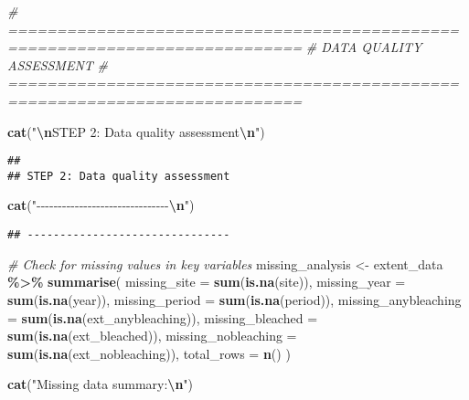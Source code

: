 \documentclass[
]{article}
\newenvironment{Shaded}{\begin{snugshade}}{\end{snugshade}}
\newcommand{\AttributeTok}[1]{\textcolor[rgb]{0.13,0.29,0.53}{#1}}
\newcommand{\CommentTok}[1]{\textcolor[rgb]{0.56,0.35,0.01}{\textit{#1}}}
\newcommand{\FunctionTok}[1]{\textcolor[rgb]{0.13,0.29,0.53}{\textbf{#1}}}
\newcommand{\NormalTok}[1]{#1}
\newcommand{\OtherTok}[1]{\textcolor[rgb]{0.56,0.35,0.01}{#1}}
\newcommand{\SpecialCharTok}[1]{\textcolor[rgb]{0.81,0.36,0.00}{\textbf{#1}}}
\newcommand{\StringTok}[1]{\textcolor[rgb]{0.31,0.60,0.02}{#1}}
\begin{document}
\begin{Shaded}
\begin{Highlighting}[]
\CommentTok{\# ============================================================================}
\CommentTok{\# DATA QUALITY ASSESSMENT}
\CommentTok{\# ============================================================================}

\FunctionTok{cat}\NormalTok{(}\StringTok{"}\SpecialCharTok{\textbackslash{}n}\StringTok{STEP 2: Data quality assessment}\SpecialCharTok{\textbackslash{}n}\StringTok{"}\NormalTok{)}
\end{Highlighting}
\end{Shaded}

\begin{verbatim}
## 
## STEP 2: Data quality assessment
\end{verbatim}

\begin{Shaded}
\begin{Highlighting}[]
\FunctionTok{cat}\NormalTok{(}\StringTok{"{-}{-}{-}{-}{-}{-}{-}{-}{-}{-}{-}{-}{-}{-}{-}{-}{-}{-}{-}{-}{-}{-}{-}{-}{-}{-}{-}{-}{-}{-}{-}}\SpecialCharTok{\textbackslash{}n}\StringTok{"}\NormalTok{)}
\end{Highlighting}
\end{Shaded}

\begin{verbatim}
## -------------------------------
\end{verbatim}

\begin{Shaded}
\begin{Highlighting}[]
\CommentTok{\# Check for missing values in key variables}
\NormalTok{missing\_analysis }\OtherTok{\textless{}{-}}\NormalTok{ extent\_data }\SpecialCharTok{\%\textgreater{}\%}
  \FunctionTok{summarise}\NormalTok{(}
    \AttributeTok{missing\_site =} \FunctionTok{sum}\NormalTok{(}\FunctionTok{is.na}\NormalTok{(site)),}
    \AttributeTok{missing\_year =} \FunctionTok{sum}\NormalTok{(}\FunctionTok{is.na}\NormalTok{(year)),}
    \AttributeTok{missing\_period =} \FunctionTok{sum}\NormalTok{(}\FunctionTok{is.na}\NormalTok{(period)),}
    \AttributeTok{missing\_anybleaching =} \FunctionTok{sum}\NormalTok{(}\FunctionTok{is.na}\NormalTok{(ext\_anybleaching)),}
    \AttributeTok{missing\_bleached =} \FunctionTok{sum}\NormalTok{(}\FunctionTok{is.na}\NormalTok{(ext\_bleached)),}
    \AttributeTok{missing\_nobleaching =} \FunctionTok{sum}\NormalTok{(}\FunctionTok{is.na}\NormalTok{(ext\_nobleaching)),}
    \AttributeTok{total\_rows =} \FunctionTok{n}\NormalTok{()}
\NormalTok{  )}

\FunctionTok{cat}\NormalTok{(}\StringTok{"Missing data summary:}\SpecialCharTok{\textbackslash{}n}\StringTok{"}\NormalTok{)}
\end{Highlighting}
\end{Shaded}
\end{document}
